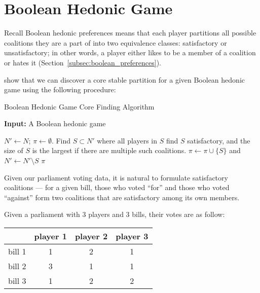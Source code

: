 \section{Boolean Hedonic Game}
\label{sec:boolean_hedonic_game}

Recall Boolean hedonic preferences means that each player partitions all possible
coalitions they are a part of into two equivalence classes:
satisfactory or unsatisfactory; in other words, a player either likes to be
a member of a coalition or hates it (Section~\ref{subsec:boolean_preferences}).

 show that we can discover a core
stable partition for a given Boolean hedonic game using the following procedure:

\begin{algorithm}[htb]
  \caption{Boolean Hedonic Game Core Finding Algorithm}
  \label{alg:boolean_core}
  \textbf{Input:} A Boolean hedonic game
  \begin{algorithmic}[1]

  \State $N' \leftarrow N$; $\pi \leftarrow \emptyset$.
    \State \label{boolean_core:select} Find $S \subset N'$ where all players
      in $S$ find $S$ satisfactory, and the size of $S$ is the largest if there
      are multiple such coalitions.
    \State $\pi \leftarrow \pi \cup \lbrace S \rbrace$ and
      $N' \leftarrow  N' \setminus S$
  \EndWhile
  \State \Return $\pi$

  \end{algorithmic}
\end{algorithm}

Given our parliament voting data, it is natural to formulate satisfactory
coalitions --- for a given bill, those who voted ``for'' and those who voted
``against'' form two coalitions that are satisfactory among its own members.

\begin{example}
\label{example:votes_boolean}
  Given a parliament with 3 players and 3 bills, their votes are as follow:

  \begin{table}[h!]
  \centering
  \begin{tabular}{|c|c|c|c|}
  \hline
         & player 1 & player 2 & player 3 \\ \hline
  bill 1 & 1 & 2 & 1 \\
  bill 2 & 3 & 1 & 1 \\
  bill 3 & 1 & 2 & 2 \\
  \hline
  \end{tabular}
  \end{table}
\end{example}

